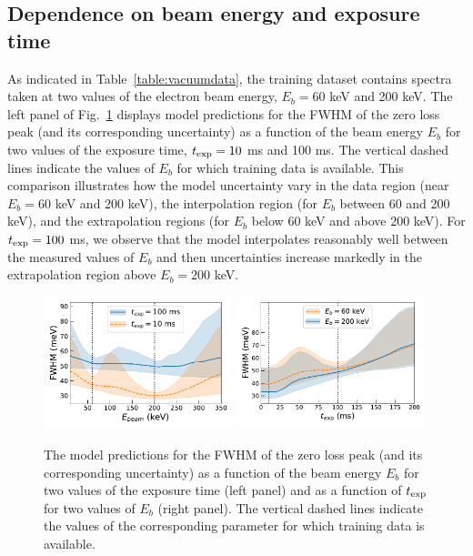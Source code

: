\subsection{Dependence on  beam energy  and exposure time }
\label{eq:depebeam}


As indicated in Table~\ref{table:vacuumdata}, the training dataset contains
spectra taken at two values of the electron beam energy, $E_b=60$ keV and 200 keV.
%
The left panel of Fig.~\ref{fig:extrapolbeam} displays  model predictions for the FWHM of the zero loss peak
      (and its corresponding uncertainty) as a function of the beam energy $E_b$
      for two values of the exposure time, $t_{\rm exp}=10$ ms and 100 ms.
      The vertical dashed lines indicate the values of $E_b$ for which training data is available.
      This comparison illustrates how the model uncertainty vary in the data region
      (near $E_b=60$ keV and 200 keV), the interpolation region (for $E_b$ between 60 and 200 keV),
      and the extrapolation regions (for $E_b$ below 60 keV and above 200 keV).
      For $t_{\rm exp}=100$ ms, we observe that the model interpolates reasonably well
      between the measured values of $E_b$ and then uncertainties increase
      markedly in the extrapolation region above $E_b=200$ keV.
      
\begin{figure}[t]
    \centering
    \includegraphics[width=0.49\textwidth]{plots/Ebeam_extrapolation.pdf}
    \includegraphics[width=0.49\textwidth]{plots/time_extrapolation.pdf}
    \caption{\small The model predictions for the FWHM of the zero loss peak
      (and its corresponding uncertainty) as a function of the beam energy $E_b$
      for two values of the exposure time (left panel)
      and as a function of $t_{\rm exp}$ for two values of $E_b$ (right panel).
      The vertical dashed lines indicate the values of the
      corresponding parameter for which training data is available.
    }
    \label{fig:extrapolbeam}
\end{figure}

